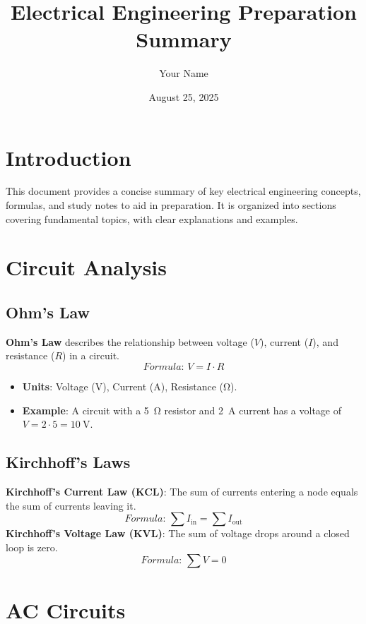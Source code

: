 \documentclass[12pt]{article}
\newcommand{\concept}[1]{\textbf{#1}}
\newcommand{\formula}[1]{\textit{Formula: }#1}
\begin{document}
\title{Electrical Engineering Preparation Summary}
\author{Your Name}
\date{August 25, 2025}
\maketitle

\tableofcontents
\newpage

\section{Introduction}
This document provides a concise summary of key electrical engineering concepts, formulas, and study notes to aid in preparation. It is organized into sections covering fundamental topics, with clear explanations and examples.

\section{Circuit Analysis}
\subsection{Ohm's Law}
\concept{Ohm's Law} describes the relationship between voltage (\(V\)), current (\(I\)), and resistance (\(R\)) in a circuit.
\[
\formula{V = I \cdot R}
\]
\begin{itemize}
    \item \textbf{Units}: Voltage (\si{\volt}), Current (\si{\ampere}), Resistance (\si{\ohm}).
    \item \textbf{Example}: A circuit with a \SI{5}{\ohm} resistor and \SI{2}{\ampere} current has a voltage of \( V = 2 \cdot 5 = \SI{10}{\volt} \).
\end{itemize}

\subsection{Kirchhoff's Laws}
\concept{Kirchhoff's Current Law (KCL)}: The sum of currents entering a node equals the sum of currents leaving it.
\[
\formula{\sum I_{\text{in}} = \sum I_{\text{out}}}
\]
\concept{Kirchhoff's Voltage Law (KVL)}: The sum of voltage drops around a closed loop is zero.
\[
\formula{\sum V = 0}
\]

\section{AC Circuits}
\end{document}
